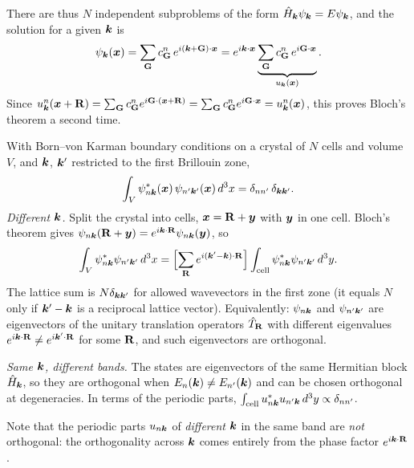 There are thus $N$ independent subproblems of the form $\hat{H}_{\bm{k}}\psi_{\bm{k}} = E\psi_{\bm{k}}$, and the solution for a given $\bm{k}$ is
\begin{equation}
    \psi_{\lvect{k}}(\lvect{x}) = \sum_{\cvect{G}} c^n_{\cvect{G}}\, e^{i(\lvect{k}+\cvect{G})\cdot\lvect{x}}
    = e^{i\lvect{k}\cdot\lvect{x}} \underbrace{\sum_{\cvect{G}} c^n_{\cvect{G}}\, e^{i\cvect{G}\cdot\lvect{x}}}_{u_{\lvect{k}}(\lvect{x})}.
\end{equation}
Since $u^n_{\lvect{k}}(\lvect{x}+\cvect{R}) = \sum_{\cvect{G}} c^n_{\cvect{G}} e^{i\cvect{G}\cdot(\lvect{x}+\cvect{R})} = \sum_{\cvect{G}} c^n_{\cvect{G}} e^{i\cvect{G}\cdot\lvect{x}} = u^n_{\lvect{k}}(\lvect{x})$, this proves Bloch's theorem a second time.

\begin{fact}
With Born--von Karman boundary conditions on a crystal of $N$ cells and volume $V$, and $\bm{k}$, $\bm{k}'$ restricted to the first Brillouin zone,
\[
    \int_V\psi^*_{n\bm{k}}(\bm{x})\,\psi_{n'\bm{k}'}(\bm{x})\,d^3x = \delta_{nn'}\,\delta_{\bm{k}\bm{k}'} .
\]
\emph{Different $\bm{k}$.} Split the crystal into cells, $\lvect{x} = \cvect{R} + \lvect{y}$ with $\bm{y}$ in one cell. Bloch's theorem gives $\psi_{n\lvect{k}}(\cvect{R}+\lvect{y}) = e^{i\lvect{k}\cdot\cvect{R}}\psi_{n\lvect{k}}(\lvect{y})$, so
\[
    \int_V\psi^*_{n\lvect{k}}\psi_{n'\lvect{k}'}\,d^3x
    = \Bigl[\sum_{\cvect{R}}e^{i(\lvect{k}'-\lvect{k})\cdot\cvect{R}}\Bigr]\int_{\text{cell}}\psi^*_{n\lvect{k}}\psi_{n'\lvect{k}'}\,d^3y .
\]
The lattice sum is $N\delta_{\bm{k}\bm{k}'}$ for allowed wavevectors in the first zone (it equals $N$ only if $\bm{k}'-\bm{k}$ is a reciprocal lattice vector). Equivalently: $\psi_{n\bm{k}}$ and $\psi_{n'\bm{k}'}$ are eigenvectors of the unitary translation operators $\hat{T}_{\cvect{R}}$ with different eigenvalues $e^{i\lvect{k}\cdot\cvect{R}}\neq e^{i\lvect{k}'\cdot\cvect{R}}$ for some $\cvect{R}$, and such eigenvectors are orthogonal.

\emph{Same $\bm{k}$, different bands.} The states are eigenvectors of the same Hermitian block $\hat{H}_{\bm{k}}$, so they are orthogonal when $E_n(\bm{k})\neq E_{n'}(\bm{k})$ and can be chosen orthogonal at degeneracies. In terms of the periodic parts, $\int_{\text{cell}}u^*_{n\bm{k}}u_{n'\bm{k}}\,d^3y\propto\delta_{nn'}$.

Note that the periodic parts $u_{n\bm{k}}$ of \emph{different} $\bm{k}$ in the same band are \emph{not} orthogonal: the orthogonality across $\bm{k}$ comes entirely from the phase factor $e^{i\lvect{k}\cdot\cvect{R}}$.
\end{fact}

